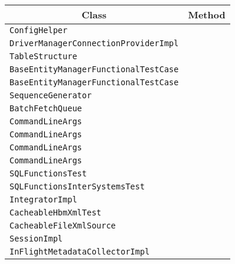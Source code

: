 \begin{center}
\begin{tabular}{ll}\toprule
\multicolumn{1}{c}{Class}&\multicolumn{1}{c}{Method}\\\midrule
\lstinline/ConfigHelper/&\raisebox{0pt}{\lstinline/getConfigStream(String)/}\\
\lstinline/DriverManagerConnectionProviderImpl/&\raisebox{0pt}{\lstinline/buildCreator(MapconfigurationValues)/}\\
\lstinline/TableStructure/&\raisebox{0pt}{\lstinline/erexecute(Connection)/}\\
\lstinline/BaseEntityManagerFunctionalTestCase/&\raisebox{0pt}{\lstinline/releaseUnclosedEntityManager(EntityManager)/}\\
\lstinline/BaseEntityManagerFunctionalTestCase/&\raisebox{0pt}{\lstinline/releaseUnclosedEntityManager(EntityManager)/}\\
\lstinline/SequenceGenerator/&\raisebox{0pt}{\lstinline/configure(Type,Properties,ServiceRegistry)/}\\
\lstinline/BatchFetchQueue/&\raisebox{0pt}{\lstinline/getCollectionBatch(CollectionPersister,Serializable,int)/}\\
\lstinline/CommandLineArgs/&\raisebox{0pt}{\lstinline/parseCommandLineArgs(String[])/}\\
\lstinline/CommandLineArgs/&\raisebox{0pt}{\lstinline/parseCommandLineArgs(String[])/}\\
\lstinline/CommandLineArgs/&\raisebox{0pt}{\lstinline/parseCommandLineArgs(String[])/}\\
\lstinline/CommandLineArgs/&\raisebox{0pt}{\lstinline/parseCommandLineArgs(String[])/}\\
\lstinline/SQLFunctionsTest/&\raisebox{0pt}{\lstinline/testSqlFunctionAsAlias()/}\\
\lstinline/SQLFunctionsInterSystemsTest/&\raisebox{0pt}{\lstinline/testSqlFunctionAsAlias()/}\\ 
\lstinline/IntegratorImpl/&\raisebox{0pt}{\lstinline/integrate(SessionFactory)/}\\
\lstinline/CacheableHbmXmlTest/&\raisebox{0pt}{\lstinline/deleteBinFile(/}\\
\lstinline/CacheableFileXmlSource/&\raisebox{0pt}{\lstinline/writeSerFile(Serializable,File,File)/}\\
\lstinline/SessionImpl/&\raisebox{0pt}{\lstinline/shouldCloseJdbcCoordinatorOnClose(boolean)/}\\
\lstinline/InFlightMetadataCollectorImpl/&\raisebox{0pt}{\lstinline/addFetchProfile(FetchProfile)/}\\

\end{tabular}
\end{center}
